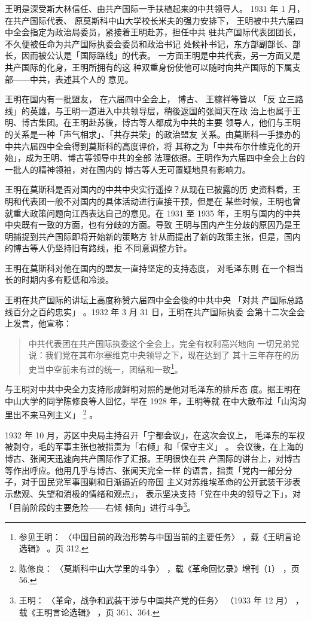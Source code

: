 王明是深受斯大林信任、由共产国际一手扶植起来的中共领导人。
1931 年 1 月，
在共产国际代表、
原莫斯科中山大学校长米夫的强力安排下，
王明被中共六届四中全会指定为政治局委员，紧接着王明赴苏，担任中共
驻共产国际代表团团长，不久便被任命为共产国际执委会委员和政治书记
处候补书记，东方部副部长、部长，因而被公认是「国际路线」的代表。
一方面王明是中共代表，另一方面又是共产国际的化身，王明所拥有的这
种双重身份使他可以随时向共产国际的下属支部——中共，表述其个人的
意见。

王明在国内有一批盟友，
在六届四中全会上，
博古、
王稼祥等皆以
「反
立三路线」的英雄，与王明一道进入中共领导层，稍後返国的张闻天在政
治上也属于王明、博古集团。在王明赴苏後，博古等人都成为中共的主要
领导人，他们与王明的关系是一种「声气相求」、「共存共荣」的政治盟友
关系。由莫斯科一手操办的中共六届四中全会得到莫斯科的高度评价，将
其称之为「中共布尔什维克化的开始」，成为王明、博古等领导中共的全部
法理依据。王明作为六届四中全会上台的一批人的精神领袖，对在国内的
博古等人无可置疑地具有影响力。

王明在莫斯科是否对国内的中共中央实行遥控？从现在已披露的历
史资料看，王明和代表团一般不对国内的具体活动进行直接干预，但是在
某些时候，王明也曾就重大政策问题向江西表达自己的意见。在 1931 至
1935 年，王明与国内的中共中央既有一致的方面，也有分歧的方面。导致
王明与国内产生分歧的原因乃是王明捕捉到共产国际即将开始新的策略方
针从而提出了新的政策主张，但是，国内的博古等人仍坚持旧有路线，拒
不同意调整方针。

王明在莫斯科对他在国内的盟友一直持坚定的支持态度，
对毛泽东则
在一个相当长的时期内多有贬低和冷淡。

王明在共产国际的讲坛上高度称赞六届四中全会後的中共中央
「对共
产国际总路线百分之百的忠实」 。1932 年 3 月 31 日，王明在共产国际执委
会第十二次全会上发言，他宣称：
\begin{quote}
	\fzwkai 中共代表团在共产国际执委这个全会上，完全有权利高兴地向
一切兄弟党说：我们党在其布尔塞维克中央领导之下，现在达到了
其十三年存在的历史当中空前未有过的统一，团结和一致\footnote{参见王明：
〈中国目前的政治形势与中国当前的主要任务〉
，载《王明言论选辑》
。页 312.}。
\end{quote}

与王明对中共中央全力支持形成鲜明对照的是他对毛泽东的排斥态
度。据王明在中山大学的同学陈修良等人回忆，早在 1928 年，王明等就
在中大散布过「山沟沟里出不来马列主义」 \footnote{陈修良：
〈莫斯科中山大学里的斗争〉
，载《革命回忆录》增刊（1）
，页 56.} 。

1932 年 10 月，苏区中央局主持召开「宁都会议」，在这次会议上，
毛泽东的军权被剥夺，毛的军事主张也被指责为「右倾」和「保守主义」 。
会议後，在上海的博古、张闻天迅速向共产国际作了汇报。王明很快在共
产国际的讲台上，对博古等作出呼应。他用几乎与博古、张闻天完全一样
的语言，指责「党内一部分分子，对于国民党军事围剿和日渐逼近的帝国
主义对苏维埃革命的公开武装干涉表示悲观、失望和消极的情绪和观点」，
表示坚决支持「党在中央的领导之下」，对「目前阶段的主要危险——右倾
倾向」进行斗争\footnote{王明：
〈革命，战争和武装干涉与中国共产党的任务〉
（1933 年 12 月）
，载《王明言论选辑》
，页 361、364.}。

